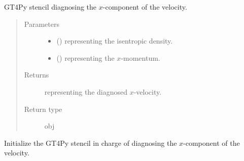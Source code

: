 \documentclass[letterpaper,10pt,english]{sphinxmanual}
\begin{document}
\begin{fulllineitems}
\begin{fulllineitems}
\end{fulllineitems}


\begin{fulllineitems}
\label{\detokenize{api:dycore.diagnostic_isentropic.DiagnosticIsentropic._stencil_diagnosing_velocity_x_defs}}
GT4Py stencil diagnosing the \(x\)-component of the velocity.
\begin{quote}\begin{description}
\item[{Parameters}] \leavevmode\begin{itemize}
\item {} 
 () \textendash{}  representing the isentropic density.

\item {} 
 () \textendash{}  representing the \(x\)-momentum.

\end{itemize}

\item[{Returns}] \leavevmode
{} representing the diagnosed \(x\)-velocity.

\item[{Return type}] \leavevmode
obj

\end{description}\end{quote}

\end{fulllineitems}


\begin{fulllineitems}
\label{\detokenize{api:dycore.diagnostic_isentropic.DiagnosticIsentropic._stencil_diagnosing_velocity_x_initialize}}
Initialize the GT4Py stencil in charge of diagnosing the \(x\)-component of the velocity.

\end{fulllineitems}


\end{fulllineitems}
\end{document}
